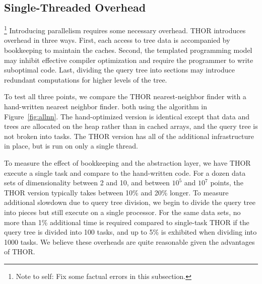 \documentclass[twoside,leqno,twocolumn]{article}
\newcommand{\authornote}[1]{\footnote{Note to self: #1}}
\newcommand{\authorsnote}[1]{\authornote{#1}}
\newcommand{\fig}[1]{Figure~\ref{fig:#1}}
\begin{document}

\subsection{Single-Threaded Overhead}


\authorsnote{Fix some factual errors in this subsection.}
Introducing parallelism requires some necessary overhead.
THOR introduces overhead in three ways.
First, each access to tree data is accompanied by bookkeeping to maintain the caches.
Second, the templated programming model may inhibit effective compiler optimization and require the programmer to write suboptimal code.
Last, dividing the query tree into sections may introduce redundant computations for higher levels of the tree.

To test all three points, we compare the THOR nearest-neighbor finder with a hand-written nearest neighbor finder. both using the algorithm in \fig{allnn}.
The hand-optimized version is identical except that data and trees are allocated on the heap rather than in cached arrays, and the query tree is not broken into tasks.
The THOR version has all of the additional infrastructure in place, but is run on only a single thread.

To measure the effect of bookkeeping and the abstraction layer, we have THOR execute a single task and compare to the hand-written code.
For a dozen data sets of dimensionality between 2 and 10, and between $10^5$ and $10^7$ points, the THOR version typically takes between 10\% and 20\% longer.
To measure additional slowdown due to query tree division, we begin to divide the query tree into pieces but still execute on a single processor.
For the same data sets, no more than 1\% additional time is required compared to single-task THOR if the query tree is divided into 100 tasks, and up to 5\% is exhibited when dividing into 1000 tasks.
We believe these overheads are quite reasonable given the advantages of THOR.

\end{document}

